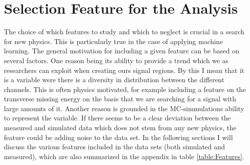 \section{Selection Feature for the Analysis}\label{sec:Feats}
The choice of which features to study and which to neglect is crucial in a search for new physics. This is particularly true 
in the case of applying machine learning. The general motivation for including a given feature can be based on several factors. 
One reason being its ability to provide a trend which we as researchers can exploit when creating ours signal regions. By this I mean
that it is a variable were there is a diversity in distribution between the different channels. This is often physics motivated, for example 
including a feature on the transverse missing energy on the basis that we are searching for a signal with large amounts of it. 
Another reason is grounded in the \ac{MC}-simmulations ability to represent the variable. If there seems to be a clear deviation between the 
measured and simulated data which does not stem from any new physics, the feature could be adding noise to the data set. In the following sections 
I will discuss the various features included in the data sets (both simulated and measured), which are also summarized in the appendix in table \ref{table:Features}.